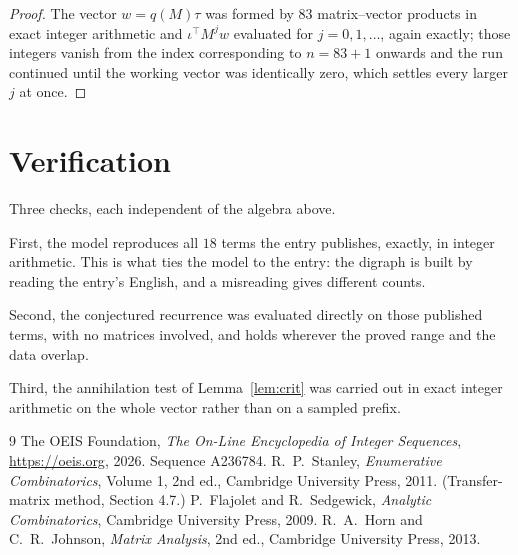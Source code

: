 \documentclass[11pt,a4paper]{article}
\theoremstyle{plain}
\theoremstyle{definition}
\begin{document}
\begin{proof}
The vector $w=q(M)\tau$ was formed by $83$ matrix--vector products in exact integer
arithmetic and $\iota^{\!\top}M^{j}w$ evaluated for $j=0,1,\dots$, again exactly; those
integers vanish from the index corresponding to $n=83+1$ onwards and the run continued
until the working vector was identically zero, which settles every larger $j$ at once.
\end{proof}

\section{Verification}

Three checks, each independent of the algebra above.

First, the model reproduces all $18$ terms the entry publishes, exactly, in integer
arithmetic. This is what ties the model to the entry: the digraph is built by reading the
entry's English, and a misreading gives different counts.

Second, the conjectured recurrence was evaluated directly on those published terms, with no
matrices involved, and holds wherever the proved range and the data overlap.

Third, the annihilation test of Lemma~\ref{lem:crit} was carried out in exact integer
arithmetic on the whole vector rather than on a sampled prefix.

\begin{thebibliography}{9}
 The OEIS Foundation, \emph{The On-Line Encyclopedia of Integer
Sequences}, \url{https://oeis.org}, 2026. Sequence A236784.
 R.~P.~Stanley, \emph{Enumerative Combinatorics}, Volume 1, 2nd ed.,
Cambridge University Press, 2011. (Transfer-matrix method, Section 4.7.)
 P.~Flajolet and R.~Sedgewick, \emph{Analytic Combinatorics}, Cambridge
University Press, 2009.
 R.~A.~Horn and C.~R.~Johnson, \emph{Matrix Analysis}, 2nd ed., Cambridge
University Press, 2013.
\end{thebibliography}
\end{document}
